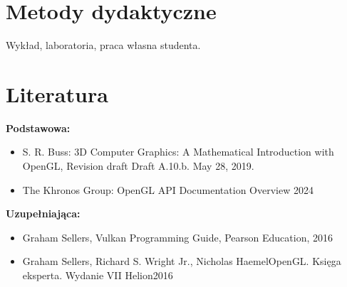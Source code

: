 \documentclass[12pt, a4paper]{article}
\begin{document}
\section{Metody dydaktyczne}

Wykład, laboratoria, praca własna studenta.

\section{Literatura}

\textbf{Podstawowa:}
\begin{itemize}
  \item S. R. Buss: 3D Computer Graphics: A Mathematical Introduction with OpenGL, Revision draft Draft A.10.b. May 28, 2019.
  \item The Khronos Group: OpenGL API Documentation Overview 2024
\end{itemize}

\textbf{Uzupełniająca:}
\begin{itemize}
  \item Graham Sellers, Vulkan Programming Guide, Pearson Education, 2016
  \item Graham Sellers, Richard S. Wright Jr., Nicholas HaemelOpenGL. Księga eksperta. Wydanie VII Helion2016
\end{itemize}
\end{document}

